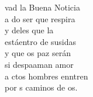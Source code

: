 \begin{cancion}%
	vad la Buena Noticia\\
	a do ser que respira\\
	y deles que la \\
	estáentro de susidas\\
	y que os paz serán\\
	si despaaman amor\\
	a ctos hombres enntren\\
	por s caminos de os.\\
	\jump\\
\end{cancion}%
